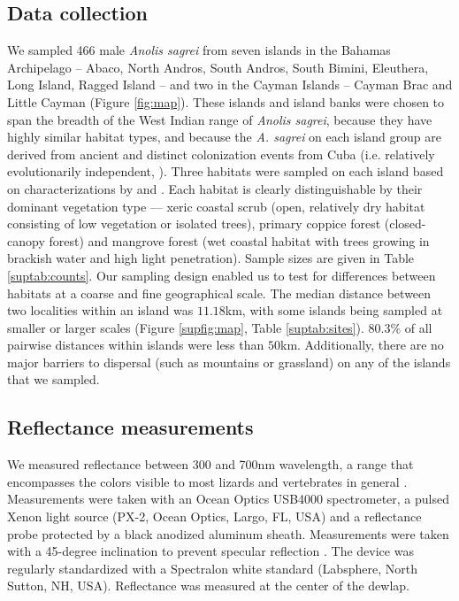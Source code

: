 
\subsection*{Data collection}
	
We sampled 466 male \textit{Anolis sagrei} from seven islands in the Bahamas Archipelago -- Abaco, North Andros, South Andros, South Bimini, Eleuthera, Long Island, Ragged Island -- and two in the Cayman Islands -- Cayman Brac and Little Cayman (Figure \ref{fig:map}). These islands and island banks were chosen to span the breadth of the West Indian range of \textit{Anolis sagrei}, because they have highly similar habitat types,  and because the \textit{A. sagrei} on each island group are derived from ancient and distinct colonization events from Cuba (i.e. relatively evolutionarily independent, \citealt{Reynolds2020}). Three habitats were sampled on each island based on characterizations by \citet{Howard1950} and \citet{Schoener1968}. Each habitat is clearly distinguishable by their dominant vegetation type --- xeric coastal scrub (open, relatively dry habitat consisting of low vegetation or isolated trees), primary coppice forest (closed-canopy forest) and mangrove forest (wet coastal habitat with trees growing in brackish water and high light penetration). Sample sizes are given in Table \ref{suptab:counts}. Our sampling design enabled us to test for differences between habitats at a coarse and fine geographical scale. The median distance between two localities within an island was $11.18$km, with some islands being sampled at smaller or larger scales (Figure \ref{supfig:map}, Table \ref{suptab:sites}). $80.3$\% of all pairwise distances within islands were less than $50$km. Additionally, there are no major barriers to dispersal (such as mountains or grassland) on any of the islands that we sampled.
	
\subsection*{Reflectance measurements}

We measured reflectance between 300 and 700nm wavelength, a range that encompasses the colors visible to most lizards and vertebrates in general \citep{Lazareva2012}. Measurements were taken with an Ocean Optics USB4000 spectrometer, a pulsed Xenon light source (PX-2, Ocean Optics, Largo, FL, USA) and a reflectance probe protected by a black anodized aluminum sheath. Measurements were taken with a 45-degree inclination to prevent specular reflection \citep{Endler1990}. The device was regularly standardized with a Spectralon white standard (Labsphere, North Sutton, NH, USA). Reflectance was measured at the center of the dewlap.

